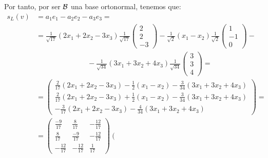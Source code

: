 \begin{ejercicio}
\begin{enumerate}
        Por tanto, por ser $\mathcal{B}$ una base ortonormal, tenemos que:
        \begin{equation*}\begin{split}
            s_{L}(v)& = a_1e_1 - a_2e_2 -a_3e_3= \\
                &= \frac{1}{\sqrt{17}}(2x_1+2x_2-3x_3)
                \frac{1}{\sqrt{17}}\left(\begin{array}{c}
                     2 \\ 2 \\ -3
                \end{array}\right)
                -\frac{1}{\sqrt{2}}(x_1-x_2)
                \frac{1}{\sqrt{2}}
                \left(\begin{array}{c}
                     1 \\ -1 \\ 0
                \end{array}\right)
                -\\
                & \hspace{3cm}
                -\frac{1}{\sqrt{34}}(3x_1+3x_2+4x_3)
                \frac{1}{\sqrt{34}}
                \left(\begin{array}{c}
                     3 \\ 3 \\ 4
                \end{array}\right)
            =\\
                &= \left(\begin{array}{c}
                     \frac{2}{17}(2x_1+2x_2-3x_3) -\frac{1}{2}(x_1-x_2) - \frac{3}{34}(3x_1+3x_2+4x_3) \\
                     \frac{2}{17}(2x_1+2x_2-3x_3) +\frac{1}{2}(x_1-x_2) -\frac{3}{34}(3x_1+3x_2+4x_3) \\
                     -\frac{3}{17}(2x_1+2x_2-3x_3) -\frac{4}{34}(3x_1+3x_2+4x_3)
                \end{array}\right)
                =\\&=
                \left(\begin{array}{ccc}
                     \frac{-9}{17} & \frac{8}{17} & -\frac{12}{17} \\
                     \frac{8}{17} & \frac{-9}{17} & -\frac{12}{17} \\
                     -\frac{12}{17} & -\frac{12}{17} & \frac{1}{17}
                \end{array}\right)
                \left(\begin{array}{c}

\end{array}
\end{split}
\end{equation*}
\end{enumerate}
\end{ejercicio}
